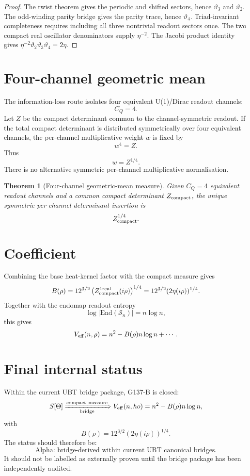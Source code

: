 \documentclass[12pt,a4paper]{article}
\newtheorem{theorem}[definition]{Theorem}
\begin{document}
\begin{proof}
The twist theorem gives the periodic and shifted sectors, hence $\vartheta_3$
and $\vartheta_2$.  The odd-winding parity bridge gives the parity trace,
hence $\vartheta_4$.  Triad-invariant completeness requires including all three
nontrivial readout sectors once.  The two compact real oscillator denominators
supply $\eta^{-2}$.  The Jacobi product identity gives
$\eta^{-2}\vartheta_2\vartheta_3\vartheta_4=2\eta$.
\end{proof}

\section{Four-channel geometric mean}

The information-loss route isolates four equivalent U(1)/Dirac readout channels:
\[
  C_Q=4.
\]
Let $Z$ be the compact determinant common to the channel-symmetric readout.  If
the total compact determinant is distributed symmetrically over four equivalent
channels, the per-channel multiplicative weight $w$ is fixed by
\[
  w^4=Z.
\]
Thus
\[
  w=Z^{1/4}.
\]
There is no alternative symmetric per-channel multiplicative normalisation.

\begin{theorem}[Four-channel geometric-mean measure]
Given $C_Q=4$ equivalent readout channels and a common compact determinant
$Z_{\rm compact}$, the unique symmetric per-channel determinant insertion is
\[
  Z_{\rm compact}^{1/4}.
\]
\end{theorem}

\section{Coefficient}

Combining the base heat-kernel factor with the compact measure gives
\[
  B(\rho)=12^{3/2}\left(Z_{\rm compact}^{1\rm real}(i\rho)\right)^{1/4}
  =12^{3/2}(2\eta(i\rho))^{1/4}.
\]
Together with the endomap readout entropy
\[
  \log|\mathrm{End}(\mathcal S_n)|=n\log n,
\]
this gives
\[
  V_{\rm eff}(n,\rho)=n^2-B(\rho)n\log n+\cdots.
\]

\section{Final internal status}

Within the current UBT bridge package, G137-B is closed:
\[
  S[\Theta]\xRightarrow[\rm bridge]{\rm compact\ measure}
  V_{\rm eff}(n,
ho)=n^2-B(\rho)n\log n,
\]
with
\[
  B(\rho)=12^{3/2}(2\eta(i\rho))^{1/4}.
\]
The status should therefore be:
\[
  \boxed{\text{Alpha: bridge-derived within current UBT canonical bridges.}}
\]
It should not be labelled as externally proven until the bridge package has been
independently audited.
\end{document}
